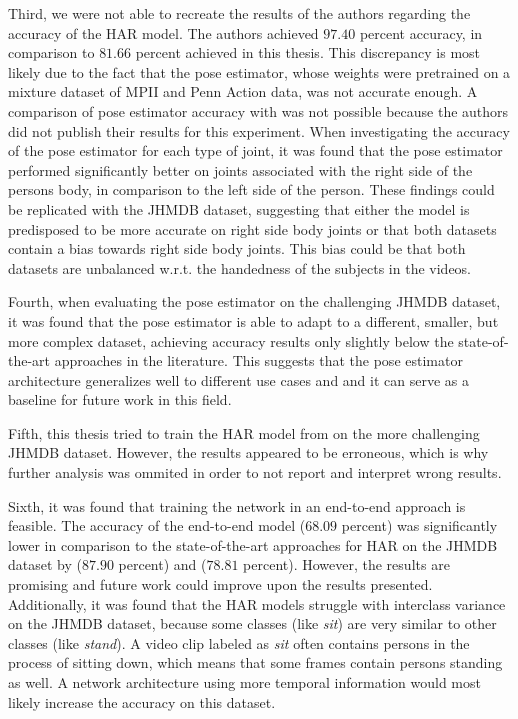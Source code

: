 Third, we were not able to recreate the results of the authors regarding the accuracy of the HAR model.
The authors achieved $97.40$ percent accuracy, in comparison to $81.66$ percent achieved in this thesis.
This discrepancy is most likely due to the fact that the pose estimator, whose weights were pretrained on a mixture dataset of MPII and Penn Action data, was not accurate enough.
A comparison of pose estimator accuracy with \cite{luvizon_2d/3d_2018} was not possible because the authors did not publish their results for this experiment.
When investigating the accuracy of the pose estimator for each type of joint, it was found that the pose estimator performed significantly better on joints associated with the right side of the persons body, in comparison to the left side of the person.
These findings could be replicated with the JHMDB dataset, suggesting that either the model is predisposed to be more accurate on right side body joints or that both datasets contain a bias towards right side body joints.
This bias could be that both datasets are unbalanced w.r.t. the handedness of the subjects in the videos. 

Fourth, when evaluating the pose estimator on the challenging JHMDB dataset, it was found that the pose estimator is able to adapt to a different, smaller, but more complex dataset, achieving accuracy results only slightly below the state-of-the-art approaches in the literature.
This suggests that the pose estimator architecture generalizes well to different use cases and and it can serve as a baseline for future work in this field.

Fifth, this thesis tried to train the HAR model from \cite{luvizon_2d/3d_2018} on the more challenging JHMDB dataset.
However, the results appeared to be erroneous, which is why further analysis was ommited in order to not report and interpret wrong results.

Sixth, it was found that training the network in an end-to-end approach is feasible.
The accuracy of the end-to-end model ($68.09$ percent) was significantly lower in comparison to the state-of-the-art approaches for HAR on the JHMDB dataset by \cite{choutas_potion:_2018} ($87.90$ percent) and \cite{khalid_multi-modal_2018} ($78.81$ percent).
However, the results are promising and future work could improve upon the results presented.
Additionally, it was found that the HAR models struggle with interclass variance on the JHMDB dataset, because some classes (like \textit{sit}) are very similar to other classes (like \textit{stand}).
A video clip labeled as \textit{sit} often contains persons in the process of sitting down, which means that some frames contain persons standing as well.
A network architecture using more temporal information would most likely increase the accuracy on this dataset.

